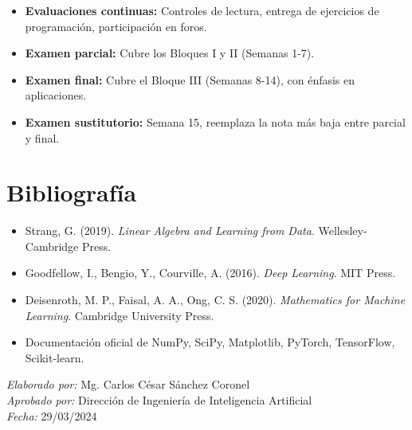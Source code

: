\documentclass[12pt,a4paper,openany,oneside]{book}
\begin{document}
\begin{itemize}
    \item \textbf{Evaluaciones continuas:} Controles de lectura, entrega de ejercicios de programación, participación en foros.
    \item \textbf{Examen parcial:} Cubre los Bloques I y II (Semanas 1-7).
    \item \textbf{Examen final:} Cubre el Bloque III (Semanas 8-14), con énfasis en aplicaciones.
    \item \textbf{Examen sustitutorio:} Semana 15, reemplaza la nota más baja entre parcial y final.
\end{itemize}

\chapter*{Bibliografía}

\begin{itemize}
    \item Strang, G. (2019). \textit{Linear Algebra and Learning from Data}. Wellesley-Cambridge Press.
    \item Goodfellow, I., Bengio, Y., Courville, A. (2016). \textit{Deep Learning}. MIT Press.
    \item Deisenroth, M. P., Faisal, A. A., Ong, C. S. (2020). \textit{Mathematics for Machine Learning}. Cambridge University Press.
    \item Documentación oficial de NumPy, SciPy, Matplotlib, PyTorch, TensorFlow, Scikit-learn.
\end{itemize}

\vspace{1cm}
\begin{flushright}
\textit{Elaborado por:} Mg. Carlos César Sánchez Coronel \\
\textit{Aprobado por:} Dirección de Ingeniería de Inteligencia Artificial \\
\textit{Fecha:} 29/03/2024
\end{flushright}
\end{document}
